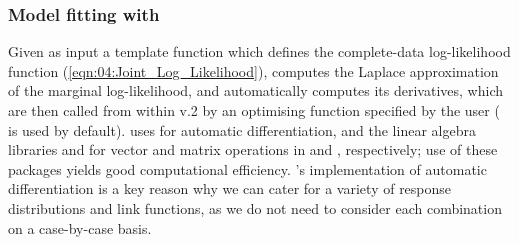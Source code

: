 \documentclass[article]{jss}
\newcommand{\fct}[1]{\code{#1()}}
\def\mbf#1{{%
\mathchoice%
{\hbox{\boldmath$\displaystyle{#1}$}}%
{\hbox{\boldmath$\textstyle{#1}$}}%
{\hbox{\boldmath$\scriptstyle{#1}$}}%
{\hbox{\boldmath$\scriptscriptstyle{#1}$}}%
}}
\def\vec{\mbf}
\newcommand{\Gau}{{\text{Gau}}}
\newcommand{\tp}{{\!\scriptscriptstyle \top}}
\begin{document}
%
%
%



\subsubsection[Model fitting with TMB]{Model fitting with }

Given as input a  template function which defines the complete-data log-likelihood function (\ref{eqn:04:Joint_Log_Likelihood}),  \citep{Kristensen_2016_TMB} computes the Laplace approximation of the marginal log-likelihood, and automatically computes its derivatives, which are then called from within  v.2 by an optimising function specified by the user (\fct{nlminb} is used by default). 
  uses  \citep{CppAD_Package} for automatic differentiation, and the linear algebra libraries  \citep{Eigen} and  \citep{Matrix_Package} for vector and matrix operations in  and , respectively; use of these packages yields good computational efficiency. 
's implementation of automatic differentiation is a key reason why we can cater for a variety of response distributions and link functions, as we do not need to consider each combination on a case-by-case basis.
\end{document}
